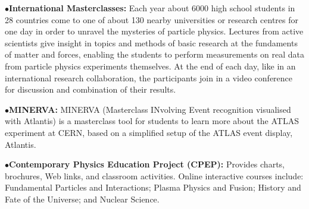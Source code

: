 \medskip

\item{$\bullet$}{\bf International Masterclasses:}
Each year about 6000 high school students in 28 countries come to one of about 130 nearby universities or research centres for one day in order to unravel the mysteries of particle physics. Lectures from active scientists give insight in topics and methods of basic research at the fundaments of matter and forces, enabling the students to perform measurements on real data from particle physics experiments themselves. At the end of each day, like in an international research collaboration, the participants join in a video conference for discussion and combination of their results.
	\item{}

\medskip

\item{$\bullet$}{\bf MINERVA:}
MINERVA (Masterclass INvolving Event recognition visualised with Atlantis) is a masterclass tool for students to learn more about the ATLAS experiment at CERN, based on a simplified setup of the ATLAS event display, Atlantis.
	\item{}

\medskip
\medskip


\item{$\bullet$}{\bf Contemporary Physics Education Project (CPEP):}
Provides charts, brochures, Web links, and classroom activities. Online interactive courses include: Fundamental Particles and Interactions; Plasma Physics and Fusion; History and Fate of the Universe; and Nuclear Science.
	\item{}




%

